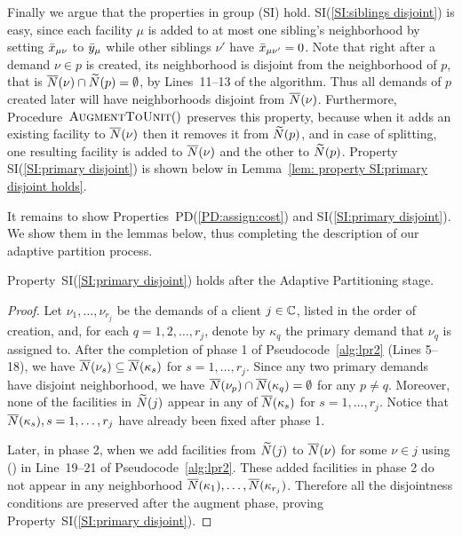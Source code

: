 \documentclass[11pt]{article}
\begin{document}
Finally we argue that the properties in group (SI)
hold. SI(\ref{SI:siblings disjoint}) is easy, since each
facility $\mu$ is added to at most one sibling's
neighborhood by setting ${\bar x}_{\mu\nu}$ to ${\bar y}_\mu$
while other siblings $\nu'$ have ${\bar x}_{\mu\nu'}=0$. Note
that right after a demand $\nu\in p$ is created, its
neighborhood is disjoint from the neighborhood of $p$, that
is ${\overline{N}}(\nu)\cap {\widetilde N}(p) = \emptyset$, by
Lines~11--13 of the algorithm. Thus all demands of $p$
created later will have neighborhoods disjoint from
${\overline{N}}(\nu)$. Furthermore, Procedure~${\textsc{AugmentToUnit}}()$
preserves this property, because when it adds an existing
facility to ${\overline{N}}(\nu)$ then it removes it from
${\widetilde N}(p)$, and in case of splitting, one resulting
facility is added to ${\overline{N}}(\nu)$ and the other to
${\widetilde N}(p)$. Property SI(\ref{SI:primary disjoint}) is shown
below in Lemma~\ref{lem: property SI:primary disjoint holds}.

It remains to show Properties~PD(\ref{PD:assign:cost}) and
SI(\ref{SI:primary disjoint}). We show them in the lemmas
below, thus completing the description of our adaptive
partition process.




\begin{lemma}\label{lem: property SI:primary disjoint holds}
  Property~SI(\ref{SI:primary disjoint}) holds after the
  Adaptive Partitioning stage.
\end{lemma}
\begin{proof}
  Let $\nu_1,\ldots,\nu_{r_j}$ be the demands of a client
  $j\in\mathbb{C}$, listed in the order of creation, and, for each
  $q=1,2,\ldots,r_j$, denote by $\kappa_q$ the primary demand that
  $\nu_q$ is assigned to. After the completion of phase 1 of
  Pseudocode~\ref{alg:lpr2} (Lines 5--18), we have
  ${\overline{N}}(\nu_s)\subseteq {\overline{N}}(\kappa_s)$ for
  $s=1,\ldots,r_j$. Since any two primary demands have disjoint
  neighborhood, we have ${\overline{N}}(\nu_p) \cap {\overline{N}}(\kappa_q) =
  \emptyset$ for any $p\neq q$. Moreover, none of the facilities in
  ${\widetilde N}(j)$ appear in any of ${\overline{N}}(\kappa_s)$ for
  $s=1,\ldots,r_j$. Notice that ${\overline{N}}(\kappa_s), s=1,\ldots,r_j$
  have already been fixed after phase 1.

  Later, in phase 2, when we add facilities from
  ${\widetilde N}(j)$ to ${\overline{N}}(\nu)$ for some $\nu\in j$ using
  \AugmentToUnit() in Line~19--21 of
  Pseudocode~\ref{alg:lpr2}. These added facilities in phase
  2 do not appear in any neighborhood ${\overline{N}}(\kappa_1),
  \ldots, {\overline{N}}(\kappa_{r_j})$.
  Therefore all the disjointness conditions are preserved
  after the augment phase, proving
  Property~SI(\ref{SI:primary disjoint}).
\end{proof}
\end{document}
